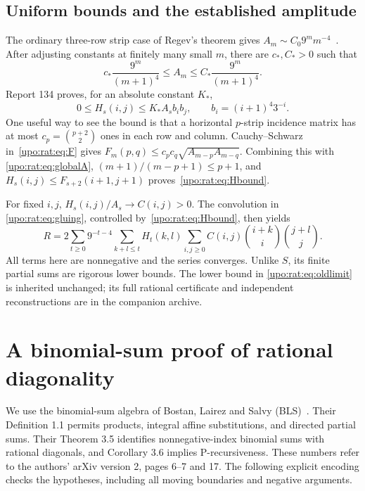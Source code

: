 \documentclass[11pt,letterpaper]{article}
\theoremstyle{remark}\newtheorem{remark}[theorem]{Remark}
\numberwithin{equation}{section}
\begin{document}
\subsection{Uniform bounds and the established amplitude}
The ordinary three-row strip case of Regev's theorem gives
$A_m\sim C_0 9^m m^{-4}$~\cite{Regev1981,Regev2010}.
After adjusting constants at finitely many small $m$, there are
$c_*,C_*>0$ such that
\begin{equation}\label{upo:rat:eq:globalA}
c_*\frac{9^m}{(m+1)^4}\le A_m\le C_*\frac{9^m}{(m+1)^4}.
\end{equation}
Report 134 proves, for an absolute constant $K_*$,
\begin{equation}\label{upo:rat:eq:Hbound}
0\le H_s(i,j)\le K_*A_s b_i b_j,
\qquad b_i=(i+1)^4 3^{-i}.
\end{equation}
One useful way to see the bound is that a horizontal $p$-strip incidence
matrix has at most $c_p=\binom{p+2}{2}$ ones in each row and column.
Cauchy--Schwarz in~\eqref{upo:rat:eq:F} gives
$F_m(p,q)\le c_pc_q\sqrt{A_{m-p}A_{m-q}}$. Combining this with
\eqref{upo:rat:eq:globalA}, $(m+1)/(m-p+1)\le p+1$, and
$H_s(i,j)\le F_{s+2}(i+1,j+1)$ proves~\eqref{upo:rat:eq:Hbound}.

For fixed $i,j$, $H_s(i,j)/A_s\to C(i,j)>0$. The convolution in
\eqref{upo:rat:eq:gluing}, controlled by~\eqref{upo:rat:eq:Hbound}, then yields
\begin{equation}\label{upo:rat:eq:Rraw}
R=2\sum_{t\ge0}9^{-t-4}\sum_{k+l\le t}H_t(k,l)
\sum_{i,j\ge0}C(i,j)\binom{i+k}{i}\binom{j+l}{j}.
\end{equation}
All terms here are nonnegative and the series converges. Unlike $S$, its
finite partial sums are rigorous lower bounds. The lower bound in
\eqref{upo:rat:eq:oldlimit} is inherited unchanged; its full rational certificate
and independent reconstructions are in the companion archive.

\section{A binomial-sum proof of rational diagonality}\label{upo:rat:sec:bls}
We use the binomial-sum algebra of Bostan, Lairez and Salvy
(BLS)~\cite{BLS}. Their Definition 1.1 permits products, integral affine
substitutions, and directed partial sums. Their Theorem 3.5 identifies
nonnegative-index binomial sums with rational diagonals, and Corollary
3.6 implies P-recursiveness. These numbers refer to the authors' arXiv
version 2, pages 6--7 and 17. The following explicit encoding checks the
hypotheses, including all moving boundaries and negative arguments.
\end{document}
